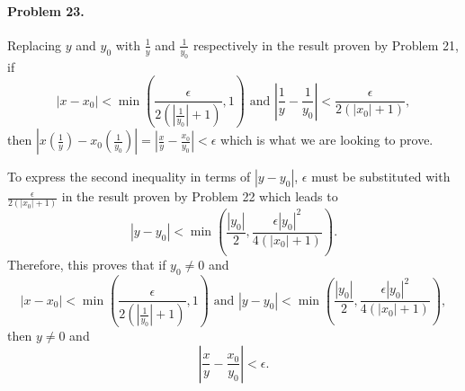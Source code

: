\documentclass{article}
\begin{document}
\paragraph{Problem 23.} Replacing $y$ and $y_0$ with $\frac{1}{y}$ and
$\frac{1}{y_0}$ respectively in the result proven by Problem 21, if \[
  |x - x_0| < \min \left( \frac{\epsilon}{2(|\frac{1}{y_0}| + 1)}, 1 \right)
  \text{ and }
  \left| \frac{1}{y} - \frac{1}{y_0} \right| < \frac{\epsilon}{2(|x_0| + 1)},
\] then $|x(\frac{1}{y}) - x_0(\frac{1}{y_0})| = \left| \frac{x}{y} -
\frac{x_0}{y_0} \right| < \epsilon$ which is what we are looking to prove.

To express the second inequality in terms of $|y - y_0|$, $\epsilon$ must be
substituted with $\frac{\epsilon}{2(|x_0| + 1)}$ in the result proven by
Problem 22 which leads to \[
  |y - y_0| < \min \left(
    \frac{|y_0|}{2},
    \frac{\epsilon|y_0|^2}{4(|x_0| + 1)}
  \right).
\] Therefore, this proves that if $y_0 \neq 0$ and \[
  |x - x_0| < \min \left(
    \frac{\epsilon}{2(|\frac{1}{y_0}| + 1)},
    1
  \right) \text{ and } |y - y_0| < \min \left(
    \frac{|y_0|}{2},
    \frac{\epsilon|y_0|^2}{4(|x_0| + 1)}
  \right),
\] then $y \neq 0$ and \[
  \left| \frac{x}{y} - \frac{x_0}{y_0} \right| < \epsilon.
\]
\end{document}
